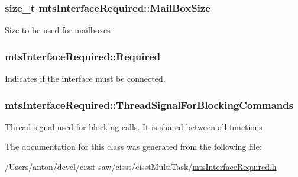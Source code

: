 \subsubsection[{Mail\+Box\+Size}]{\setlength{\rightskip}{0pt plus 5cm}size\+\_\+t mts\+Interface\+Required\+::\+Mail\+Box\+Size\hspace{0.3cm}{\ttfamily [protected]}}\label{classmts_interface_required_a7e9f87dc80d231cab9df4bb446df964a}
Size to be used for mailboxes \hypertarget{classmts_interface_required_afab8d38a3a48765ecdf8d4349521f01e}{}
\subsubsection[{Required}]{ mts\+Interface\+Required\+::\+Required\hspace{0.3cm}{\ttfamily [protected]}}\label{classmts_interface_required_afab8d38a3a48765ecdf8d4349521f01e}
Indicates if the interface must be connected. \hypertarget{classmts_interface_required_a99419345347d51f917ed98a270ce9366}{}
\subsubsection[{Thread\+Signal\+For\+Blocking\+Commands}]{ mts\+Interface\+Required\+::\+Thread\+Signal\+For\+Blocking\+Commands\hspace{0.3cm}{\ttfamily [protected]}}\label{classmts_interface_required_a99419345347d51f917ed98a270ce9366}
Thread signal used for blocking calls. It is shared between all functions 

The documentation for this class was generated from the following file\+:\begin{DoxyCompactItemize}
\item 
/\+Users/anton/devel/cisst-\/saw/cisst/cisst\+Multi\+Task/\hyperlink{mts_interface_required_8h}{mts\+Interface\+Required.\+h}\end{DoxyCompactItemize}
